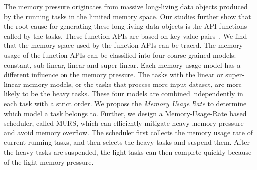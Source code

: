 The memory pressure originates from massive long-living data objects produced by the running tasks in the limited memory space. Our studies further show that the root cause for generating these long-living data objects is the API functions called by the tasks. These function APIs are based on key-value pairs~\cite{dean2008mapreduce, zaharia2012resilient, hueske2012opening, isard2007dryad}. We find that the memory space used by the function APIs can be traced. The memory usage of the function APIs can be classified into four coarse-grained models: constant, sub-linear, linear and super-linear. Each memory usage model has a different influence on the memory pressure. The tasks with the linear or super-linear memory models, or the tasks that process more input dataset, are more likely to be the heavy tasks. These four models are combined independently in each task with a strict order. We propose the \textit{Memory Usage Rate} to determine which model a task belongs to. Further, we design a Memory-Usage-Rate based scheduler, called MURS, which can efficiently mitigate heavy memory pressure and avoid memory overflow. The scheduler first collects the memory usage rate of current running tasks, and then selects the heavy tasks and suspend them. After the heavy tasks are suspended, the light tasks can then complete quickly because of the light memory pressure. 


